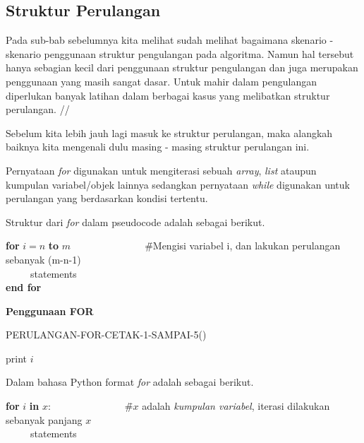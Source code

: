 \subsection{Struktur Perulangan}
Pada sub-bab sebelumnya kita melihat sudah melihat bagaimana skenario - skenario penggunaan struktur pengulangan pada algoritma. Namun hal tersebut hanya sebagian kecil dari penggunaan struktur pengulangan dan juga merupakan penggunaan yang masih sangat dasar. Untuk mahir dalam pengulangan diperlukan banyak latihan dalam berbagai kasus yang melibatkan struktur perulangan. //

Sebelum kita lebih jauh lagi masuk ke struktur perulangan, maka alangkah baiknya kita mengenali dulu masing - masing struktur perulangan ini. 



 Pernyataan \textit{for} digunakan untuk mengiterasi sebuah \textit{array}, \textit{list} ataupun kumpulan variabel/objek lainnya sedangkan pernyataan \textit{while} digunakan untuk perulangan yang berdasarkan kondisi tertentu.

Struktur dari \textit{for} dalam pseudocode adalah sebagai berikut.
\begin{tabbing}
\textbf{for} $i=n$ \textbf{to} $m$~~~~~~~~~~~~~~~\=\#Mengisi variabel i, dan lakukan perulangan sebanyak (m-n-1)\\
~~~~~statements\\
\textbf{end for}
\end{tabbing}

\begin{contoh}
	\textbf{Penggunaan FOR}
	\begin{algorithm}
	\caption{PERULANGAN-FOR-CETAK-1-SAMPAI-5()}
		\begin{algorithmic}[1]
			\STATE print $i$
		\ENDFOR
		\STATE{}
		\STATE{}
		\end{algorithmic}
	\end{algorithm}
\end{contoh}

Dalam bahasa Python format \textit{for} adalah sebagai berikut.
\begin{tabbing}
\textbf{for} $i$ \textbf{in} $x$:~~~~~~~~~~~~~~~\=\#$x$ adalah \textit{kumpulan variabel}, iterasi dilakukan sebanyak panjang $x$\\
~~~~~statements\\
\end{tabbing}

